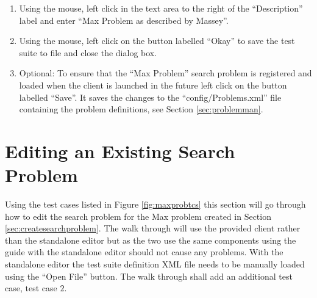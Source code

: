 \begin{enumerate}
\item Using the mouse, left click in the text area to the right of the ``Description'' label and enter ``Max Problem as described by Massey''.

\item Using the mouse, left click on the button labelled ``Okay'' to save the test suite to file and close the dialog box.

\item \label{enum:loadsaveprobs}Optional: To ensure that the ``Max Problem'' search problem is registered and loaded when the client is launched in the future left click on the button labelled ``Save''.
It saves the changes to the ``config/Problems.xml'' file containing the problem definitions, see Section \ref{sec:problemman}.

\end{enumerate}

\section{Editing an Existing Search Problem}

Using the test cases listed in Figure \ref{fig:maxprobtcs} this section will go through how to edit the search problem for the Max problem created in Section \ref{sec:createsearchproblem}.
The walk through will use the provided client rather than the standalone editor but as the two use the same components using the guide with the standalone editor should not cause any problems.
With the standalone editor the test suite definition XML file needs to be manually loaded using the ``Open File'' button.
The walk through shall add an additional test case, test case $2$.

